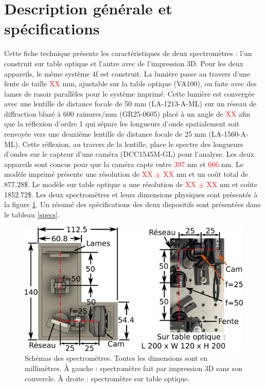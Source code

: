 \documentclass[11pt,letterpaper]{article}
\begin{document}
\section{Description générale et spécifications}

Cette fiche technique présente les caractéristiques de deux spectromètres : l'un construit sur 
table optique et l'autre avec de l'impression 3D. Pour les deux appareils, le même système 4f
est construit. La lumière passe au travers d'une fente de taille \textcolor{red}{XX} mm, 
ajustable sur la table optique (VA100), ou faite avec des lames de rasoir parallèles pour le
système imprimé. Cette lumière est convergée avec une lentille de distance focale de 50 mm 
(LA-1213-A-ML) sur un réseau de diffraction blazé à 600 rainures/mm (GR25-0605) placé à un
angle de \textcolor{red}{XX}\degree $\;$afin que la réflexion d'ordre 1 qui sépare les
longueurs d'onde spatialement soit renvoyée vers une deuxième lentille de distance focale
de 25 mm (LA-1560-A-ML). Cette réflexion, au travers de la lentille, place le spectre des 
longueurs d'ondes sur le capteur d'une caméra (DCC1545M-GL) pour l'analyse. Les deux appareils
sont concus pour que la caméra capte entre \textcolor{red}{397} nm et \textcolor{red}{666} nm. Le modèle imprimé présente une
résolution de \textcolor{red}{XX $\pm$ XX} nm et un coût total de 877.28\$. Le modèle sur
table optique a une résolution de \textcolor{red}{XX $\pm$ XX} nm et coûte 1852.72\$. Les
deux spectromètres et leurs dimensions physiques sont présentés à la figure 
\ref{schema_spectros}. Un résumé des spécifications des deux dispositifs sont présentées dans le tableau \ref{specs}. 


\begin{figure}[H]
  \centering
  \includegraphics[scale=1.75]{schema_spectros.png}
  \caption{Schémas des spectromètres. Toutes les dimensions sont en millimètres. À gauche : spectromètre fait par impression 3D sans son couvercle. À droite : spectromètre sur table optique.}
  \label{schema_spectros}
\end{figure}
\end{document}
